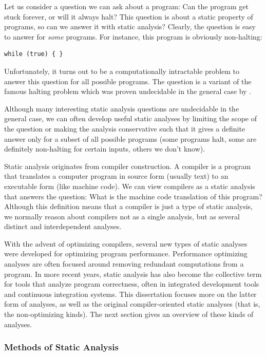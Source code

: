 \documentclass[10pt, twoside, openright]{book}
\begin{document}
Let us consider a question we can ask about a program:
Can the program get stuck forever, or will it always halt?  This question is about a
static property of programs, so can we answer it with static analysis? Clearly, the question
is easy to answer for \emph{some} programs. For instance, this program is obviously non-halting:

\begin{lstlisting}
while (true) { }
\end{lstlisting}

\noindent
Unfortunately, it turns out to be a computationally intractable problem to answer this question for
all possible programs.
The question is a variant of the 
famous halting problem which was proven undecidable in
the general case by \textcite{turing1937computable}.

Although many interesting static analysis questions are undecidable in the general case,
we can often
develop useful static analyses by limiting the scope of the question or making
the analysis conservative such that it gives a definite answer only for a subset
of all possible programs (some programs halt, some are definitely non-halting for certain inputs,
others we don't know).

Static analysis originates from compiler construction. A compiler is a program
that translates a computer program in source form (usually text) to an executable form (like
machine code).  We can view compilers as a static analysis that answers
the question: What is the machine code translation of this program?
Although this definition means that a compiler is just a type of static
analysis, we normally reason about compilers not as a single analysis, but as
several distinct and interdependent analyses.

With the advent of optimizing compilers, several new types of static analyses were developed
for optimizing program performance. Performance optimizing analyses are often focused around
removing redundant computations from a program. In more recent years, static analysis
has also become the collective term for tools that analyze program correctness, often in
integrated development tools and continuous integration systems.
This dissertation focuses more on the latter form of analyses, as well as the original
compiler-oriented static analyses (that is, the non-optimizing kinds).
The next section gives an overview of these kinds of analyses.


\subsubsection{Methods of Static Analysis}
\end{document}

